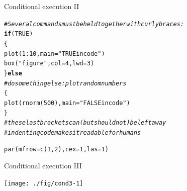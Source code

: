 \documentclass[xcolor=table,           xcolor=dvipsnames]{beamer}\usepackage[]{graphicx}\usepackage[]{color}
\makeatletter
\newcommand{\hlnum}[1]{\textcolor[rgb]{0,0,0}{#1}}
\newcommand{\hlstr}[1]{\textcolor[rgb]{0.545,0.137,0.137}{#1}}
\newcommand{\hlcom}[1]{\textcolor[rgb]{0,0.392,0}{\textit{#1}}}
\newcommand{\hlopt}[1]{\textcolor[rgb]{0,0,0}{#1}}
\newcommand{\hlstd}[1]{\textcolor[rgb]{0,0,0}{#1}}
\newcommand{\hlkwa}[1]{\textcolor[rgb]{1,0,0}{\textbf{#1}}}
\newcommand{\hlkwc}[1]{\textcolor[rgb]{1,0,1}{#1}}
\newcommand{\hlkwd}[1]{\textcolor[rgb]{0,0,1}{#1}}
\newenvironment{kframe}{%
 \def\at@end@of@kframe{}%
 \ifinner\ifhmode%
  \def\at@end@of@kframe{\end{minipage}}%
  \begin{minipage}{\columnwidth}%
 \fi\fi%
 \def\FrameCommand##1{\hskip\@totalleftmargin \hskip-\fboxsep
 \colorbox{shadecolor}{##1}\hskip-\fboxsep
     \hskip-\linewidth \hskip-\@totalleftmargin \hskip\columnwidth}%
 \MakeFramed {\advance\hsize-\width
   \@totalleftmargin\z@ \linewidth\hsize
   \@setminipage}}%
 {\par\unskip\endMakeFramed%
 \at@end@of@kframe}
\newenvironment{knitrout}{}{} %
\makeatother
\begin{document}
\begin{frame}[fragile]{Conditional execution II}
\begin{knitrout}
\color{fgcolor}\begin{kframe}
\begin{alltt}
\hlcom{# Several commands must be held together with curly braces:}
\hlkwa{if}\hlstd{(}\hlnum{TRUE}\hlstd{)}
  \hlstd{\{}
  \hlkwd{plot}\hlstd{(}\hlnum{1}\hlopt{:}\hlnum{10}\hlstd{,} \hlkwc{main}\hlstd{=}\hlstr{"TRUE in code"}\hlstd{)}
  \hlkwd{box}\hlstd{(}\hlstr{"figure"}\hlstd{,} \hlkwc{col}\hlstd{=}\hlnum{4}\hlstd{,} \hlkwc{lwd}\hlstd{=}\hlnum{3}\hlstd{)}
  \hlstd{\}} \hlkwa{else}
\hlcom{# do something else: plot random numbers}
    \hlstd{\{}
    \hlkwd{plot}\hlstd{(}\hlkwd{rnorm}\hlstd{(}\hlnum{500}\hlstd{),} \hlkwc{main}\hlstd{=}\hlstr{"FALSE in code"}\hlstd{)}
    \hlstd{\}}
\hlcom{# these last brackets can (but should not) be left away}
\hlcom{# indenting code makes it readable for humans}

\hlkwd{par}\hlstd{(}\hlkwc{mfrow}\hlstd{=}\hlkwd{c}\hlstd{(}\hlnum{1}\hlstd{,}\hlnum{2}\hlstd{),} \hlkwc{cex}\hlstd{=}\hlnum{1}\hlstd{,} \hlkwc{las}\hlstd{=}\hlnum{1}\hlstd{)}
\end{alltt}
\end{kframe}
\end{knitrout}
\end{frame}


\begin{frame}[fragile]{Conditional execution III}
\begin{knitrout}
\color{fgcolor}

{\centering \texttt{[image: ./fig/cond3-1]} 

}



\end{knitrout}
\end{frame}

\end{document}
